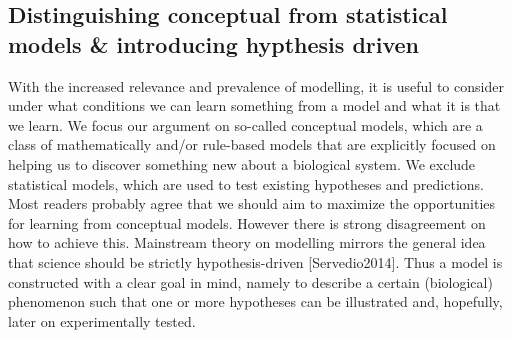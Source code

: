 \subsection{Distinguishing conceptual from statistical models & introducing hypthesis driven}

With the increased relevance and prevalence of modelling, it is useful to consider under what conditions we can learn something from a model and what it is that we learn. We focus our argument on so-called conceptual models, which are a class of mathematically and/or rule-based models that are explicitly focused on helping us to discover something new about a biological system. We exclude statistical models, which are used to test existing hypotheses and predictions. Most readers probably agree that we should aim to maximize the opportunities for learning from conceptual models. However there is strong disagreement on how to achieve this. Mainstream theory on modelling mirrors the general idea that science should be strictly hypothesis-driven [Servedio2014]. Thus a model is constructed with a clear goal in mind, namely to describe a certain (biological) phenomenon such that one or more hypotheses can be illustrated and, hopefully, later on experimentally tested.
